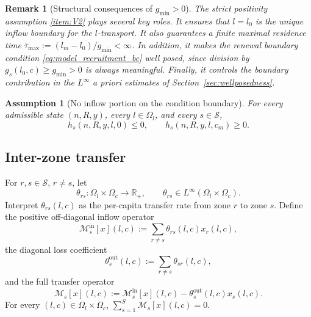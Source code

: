 \documentclass[pdflatex,sn-mathphys-num]{sn-jnl}%
\newtheorem{assumption}[theorem]{Assumption}
\newtheorem{remark}[theorem]{Remark}
\begin{document}
\begin{remark}[Structural consequences of \(g_{\min}>0\)]\label{rem:gmin_role}
The strict positivity assumption \ref{item:V2} plays several key roles.
It ensures that \(l=l_0\) is the unique inflow boundary for the \(l\)-transport.
It also guarantees a finite maximal residence time
\(\bar\tau_{\max}:=(l_m-l_0)/g_{\min}<\infty\). In addition,
it makes the renewal boundary condition \eqref{eq:model_recruitment_bc}
well posed, since division by \(g_s(l_0,c)\ge g_{\min}>0\) is always meaningful. Finally, it controls the boundary contribution in the \(L^\infty\) a priori estimates
of Section~\ref{sec:wellposedness}.
\end{remark}

\begin{assumption}[No inflow portion on the condition boundary]
\label{ass:model_condition_boundary_orientation}
For every admissible state \((n,R,y)\), every \(l\in\Omega_l\), and every \(s\in\mathcal S\),
\[
h_s(n,R,y,l,0)\le 0,
\qquad
h_s(n,R,y,l,c_m)\ge 0.
\]
\end{assumption}

\subsection{Inter-zone transfer}
For \(r,s\in\mathcal S\), \(r\neq s\), let
\[
\theta_{rs}:\Omega_l\times\Omega_c\to\mathbb R_+,
\qquad
\theta_{rs}\in L^\infty(\Omega_l\times\Omega_c).
\]
Interpret \(\theta_{rs}(l,c)\) as the per-capita transfer rate from zone \(r\) to zone
\(s\). Define the positive off-diagonal inflow operator
\begin{equation}\label{eq:model_transfer_in}
\mathcal M_s^{\mathrm{in}}[x](l,c)
:=
\sum_{r\neq s}\theta_{rs}(l,c)x_r(l,c),
\end{equation}
the diagonal loss coefficient
\begin{equation}\label{eq:model_transfer_out_coeff}
\theta_s^{\mathrm{out}}(l,c)
:=
\sum_{r\neq s}\theta_{sr}(l,c),
\end{equation}
and the full transfer operator
\begin{equation}\label{eq:model_transfer_operator}
\mathcal M_s[x](l,c)
:=
\mathcal M_s^{\mathrm{in}}[x](l,c)-\theta_s^{\mathrm{out}}(l,c)x_s(l,c).
\end{equation}
For every \((l,c)\in\Omega_l\times\Omega_c\),
\(\sum_{s=1}^S\mathcal M_s[x](l,c)=0\).
\end{document}
